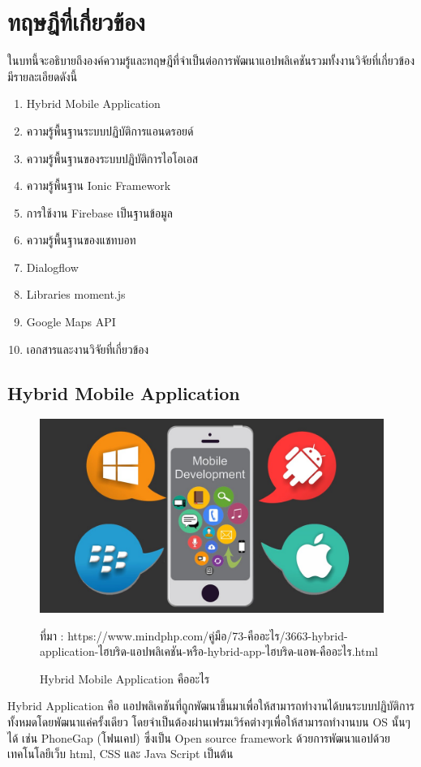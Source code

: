\chapter{ทฤษฎีที่เกี่ยวข้อง}
ในบทนี้จะอธิบายถึงองค์ความรู้และทฤษฎีที่จำเป็นต่อการพัฒนาแอปพลิเคชันรวมทั้งงานวิจัยที่เกี่ยวข้อง มีรายละเอียดดังนี้
\begin{enumerate}[label=2.\arabic*]
	\item Hybrid Mobile Application
	\item ความรู้พื้นฐานระบบปฏิบัติการแอนดรอยด์
	\item ความรู้พื้นฐานของระบบปฏิบัติการไอโอเอส
	\item ความรู้พื้นฐาน Ionic Framework
	\item การใช้งาน Firebase เป็นฐานข้อมูล
	\item ความรู้พื้นฐานของแชทบอท
	\item Dialogflow
	\item Libraries moment.js
	\item Google Maps API
	\item เอกสารและงานวิจัยที่เกี่ยวข้อง
\end{enumerate}

\section{Hybrid Mobile Application}

\begin{figure}[H]
	\centering
	\includegraphics[width=0.5\columnwidth]{Figures/2/hybrid}
	\caption{Hybrid Mobile Application คืออะไร}{ที่มา :  https://www.mindphp.com/คู่มือ/73-คืออะไร/3663-hybrid-application-ไฮบริด-แอปพลิเคชัน-หรือ-hybrid-app-ไฮบริด-แอพ-คืออะไร.html}
	\label{Fig:maketshare}
\end{figure}

Hybrid Application คือ แอปพลิเคชันที่ถูกพัฒนาขึ้นมาเพื่อให้สามารถทำงานได้บนระบบปฏิบัติการทั้งหมดโดยพัฒนาแค่ครั้งเดียว 
โดยจำเป็นต้องผ่านเฟรมเวิร์คต่างๆเพื่อให้สามารถทำงานบน OS นั้นๆได้ เช่น PhoneGap (โฟนเคป) ซึ่งเป็น Open source framework 
ด้วยการพัฒนาแอปด้วยเทคโนโลยีเว็บ html, CSS และ Java Script เป็นต้น 

